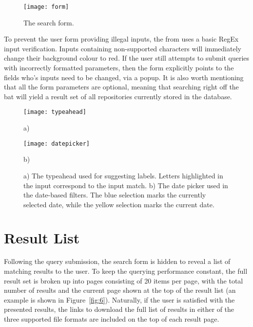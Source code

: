 \begin{figure}[ht!]
    \centering
    \texttt{[image: form]}
    \caption{The search form.}
    \label{fig:3}
\end{figure}

To prevent the user form providing illegal inputs, the from uses a basic RegEx input verification.
Inputs containing non-supported characters will immediately change their background colour to red.
If the user still attempts to submit queries with incorrectly formatted parameters, then the form explicitly points to the fields who's inputs need to be changed, via a popup.
It is also worth mentioning that all the form parameters are optional, meaning that searching right off the bat will yield a result set of all repositories currently stored in the database.

\begin{figure}[ht!]
    \centering
    \begin{minipage}[b][][b]{0.60\textwidth}
        \centering
        \texttt{[image: typeahead]}
        \caption*{a)}
    \end{minipage}\hfill
    \begin{minipage}[b][][b]{0.40\textwidth}
        \centering
        \texttt{[image: datepicker]}
        \caption*{b)}
    \end{minipage}
    \label{fig:4}
    \caption[Form input typeahead and date picker]{a) The typeahead used for suggesting labels. Letters highlighted in the input correspond to the input match. b) The date picker used in the date-based filters. The blue selection marks the currently selected date, while the yellow selection marks the current date.}
\end{figure}

\newpage
\section{Result List}

Following the query submission, the search form is hidden to reveal a list of matching results to the user.
To keep the querying performance constant, the full result set is broken up into pages consisting of 20 items per page, with the total number of results and the current page shown at the top of the result list (an example is shown in Figure~\ref{fig:6}).
Naturally, if the user is satisfied with the presented results, the links to download the full list of results in either of the three supported file formats are included on the top of each result page.

